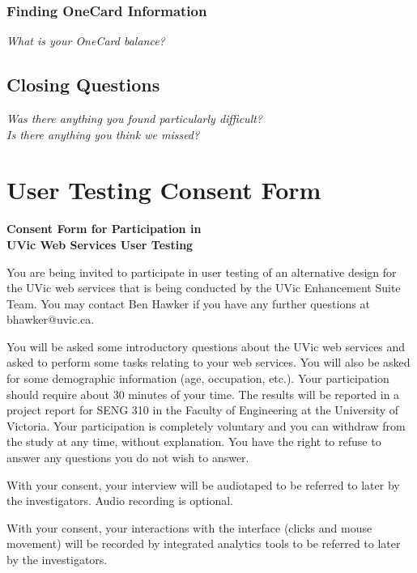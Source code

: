 \documentclass{article}
\begin{document}
\begin{appendices}
\subsubsection*{Finding OneCard Information}\label{finding-onecard-information}
\emph{What is your OneCard balance?} \\
\subsection*{Closing Questions}\label{closing-questions}
\emph{Was there anything you found particularly difficult?} \\
\emph{Is there anything you think we missed?} \\

\pagebreak

\section{User Testing Consent Form}\label{ap:ut-consent}

\begin{center}
    \textbf{Consent Form for Participation in \\ UVic Web Services User Testing}
\end{center}

You are being invited to participate in user testing of an alternative design for the UVic web services that is being conducted by the UVic Enhancement Suite Team.  You may contact Ben Hawker if you have any further questions at bhawker@uvic.ca.
 
You will be asked some introductory questions about the UVic web services and asked to perform some tasks relating to your web services.  You will also be asked for some demographic information (age, occupation, etc.).  Your participation should require about 30 minutes of your time.  The results will be reported in a project report for SENG 310 in the Faculty of Engineering at the University of Victoria.
Your participation is completely voluntary and you can withdraw from the study at any time, without explanation.  You have the right to refuse to answer any questions you do not wish to answer.

With your consent, your interview will be audiotaped to be referred to later by the investigators. Audio recording is optional.

With your consent, your interactions with the interface (clicks and mouse movement) will be recorded by integrated analytics tools to be referred to later by the investigators. 


\end{appendices}
\end{document}
